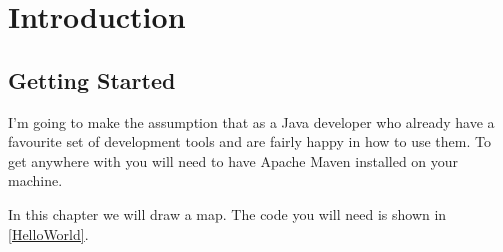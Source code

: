 \chapter{Introduction}\label{introduction}

\section{Getting Started}
I'm going to make the assumption that as a Java developer who already have a favourite set of development tools and are fairly happy in how to use them. To get anywhere with \GeoTools you will need to have Apache Maven installed on your machine. 

In this chapter we will draw a map. The code you will need is shown in \cref{HelloWorld}.



